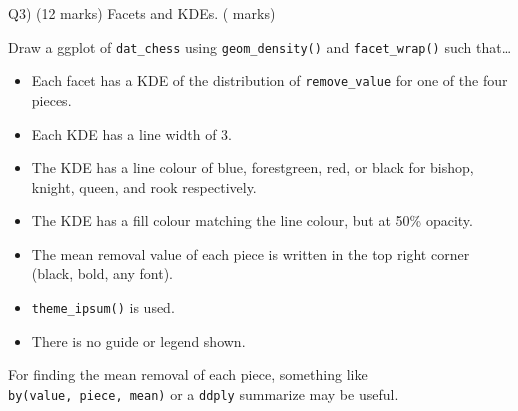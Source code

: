 \documentclass[
]{article}
\providecommand{\tightlist}{%
  \setlength{\itemsep}{0pt}\setlength{\parskip}{0pt}}
\begin{document}
\newpage

Q3) (12 marks) Facets and KDEs. ( marks)

Draw a ggplot of \texttt{dat\_chess} using \texttt{geom\_density()} and
\texttt{facet\_wrap()} such that\ldots{}

\begin{itemize}
\tightlist
\item
  Each facet has a KDE of the distribution of \texttt{remove\_value} for
  one of the four pieces.
\item
  Each KDE has a line width of 3.
\item
  The KDE has a line colour of blue, forestgreen, red, or black for
  bishop, knight, queen, and rook respectively.
\item
  The KDE has a fill colour matching the line colour, but at 50\%
  opacity.
\item
  The mean removal value of each piece is written in the top right
  corner (black, bold, any font).
\item
  \texttt{theme\_ipsum()} is used.
\item
  There is no guide or legend shown.
\end{itemize}

For finding the mean removal of each piece, something like
\texttt{by(value,\ piece,\ mean)} or a \texttt{ddply} summarize may be
useful.
\end{document}
